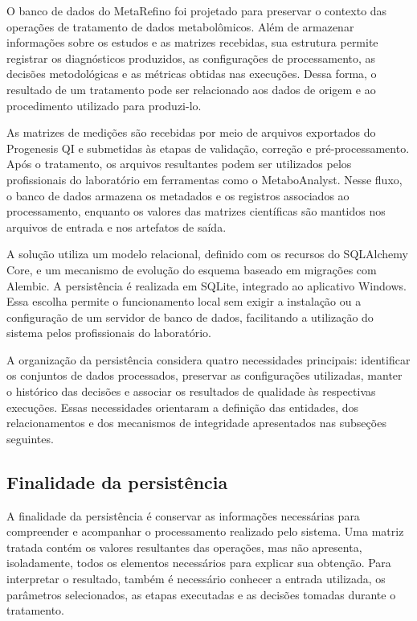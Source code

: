 O banco de dados do MetaRefino foi projetado para preservar o contexto das operações de tratamento de dados metabolômicos. Além de armazenar informações sobre os estudos e as matrizes recebidas, sua estrutura permite registrar os diagnósticos produzidos, as configurações de processamento, as decisões metodológicas e as métricas obtidas nas execuções. Dessa forma, o resultado de um tratamento pode ser relacionado aos dados de origem e ao procedimento utilizado para produzi-lo.

As matrizes de medições são recebidas por meio de arquivos exportados do Progenesis QI e submetidas às etapas de validação, correção e pré-processamento. Após o tratamento, os arquivos resultantes podem ser utilizados pelos profissionais do laboratório em ferramentas como o MetaboAnalyst. Nesse fluxo, o banco de dados armazena os metadados e os registros associados ao processamento, enquanto os valores das matrizes científicas são mantidos nos arquivos de entrada e nos artefatos de saída.

A solução utiliza um modelo relacional, definido com os recursos do SQLAlchemy Core, e um mecanismo de evolução do esquema baseado em migrações com Alembic. A persistência é realizada em SQLite, integrado ao aplicativo Windows. Essa escolha permite o funcionamento local sem exigir a instalação ou a configuração de um servidor de banco de dados, facilitando a utilização do sistema pelos profissionais do laboratório.

A organização da persistência considera quatro necessidades principais: identificar os conjuntos de dados processados, preservar as configurações utilizadas, manter o histórico das decisões e associar os resultados de qualidade às respectivas execuções. Essas necessidades orientaram a definição das entidades, dos relacionamentos e dos mecanismos de integridade apresentados nas subseções seguintes.

\subsection{Finalidade da persistência}
\label{subsec:finalidade-persistencia}

A finalidade da persistência é conservar as informações necessárias para compreender e acompanhar o processamento realizado pelo sistema. Uma matriz tratada contém os valores resultantes das operações, mas não apresenta, isoladamente, todos os elementos necessários para explicar sua obtenção. Para interpretar o resultado, também é necessário conhecer a entrada utilizada, os parâmetros selecionados, as etapas executadas e as decisões tomadas durante o tratamento.


